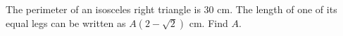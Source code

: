 The perimeter of an isosceles right triangle is $30$ cm. The length of one of its equal legs can be written as $A\left(2-\sqrt2\right)$ cm. Find $A$.
